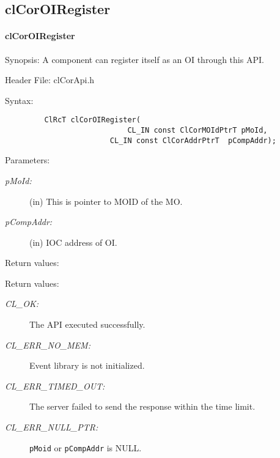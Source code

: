 \begin{flushleft}
\subsection{clCorOIRegister}
\hypertarget{pagecor135}{}\paragraph{cl\-Cor\-OI\-Register}\label{pagecor135}
\begin{Desc}
\item[Synopsis:] A component can register itself as an OI through this API.\end{Desc}
\begin{Desc}
\item[Header File:]clCorApi.h\end{Desc}
\begin{Desc}
\item[Syntax:]

\footnotesize\begin{verbatim}         ClRcT clCorOIRegister( 
    						CL_IN const ClCorMOIdPtrT pMoId,
						CL_IN const ClCorAddrPtrT  pCompAddr);

\end{verbatim}
\normalsize
\end{Desc}
\begin{Desc}
\item[Parameters:]
\begin{description}
\item[{\em p\-MoId:}](in) This is pointer to MOID of the MO.
\item[{\em p\-Comp\-Addr:}](in) IOC address of OI.
\end{description}
\end{Desc}
\begin{Desc}
\item[Return values:]\end{Desc}
\begin{Desc}
\item[Return values:]
\begin{description}
\item[{\em CL\_\-OK:}]The API executed successfully. 
\item[{\em CL\_\-ERR\_\-NO\_\-MEM:}]Event library is not initialized. 
 \item[{\em CL\_\-ERR\_\-TIMED\_\-OUT:}] The server failed to send the response within the time limit.  
 \item[{\em CL\_\-ERR\_\-NULL\_\-PTR:}] {\tt{pMoid}} or {\tt{pCompAddr}} is NULL.


\end{description}
\end{Desc}
\end{flushleft}
